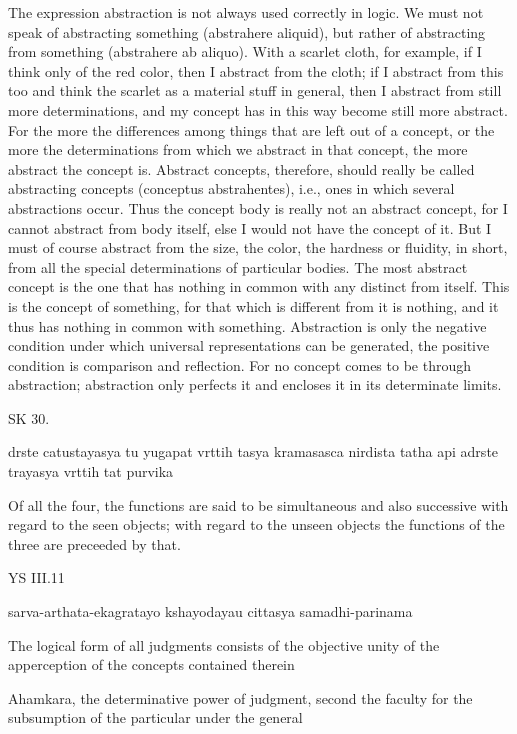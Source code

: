     The expression abstraction is not always used correctly in logic.
    We must not speak of abstracting something (abstrahere aliquid),
    but rather of abstracting from something (abstrahere ab aliquo).
    With a scarlet cloth, for example, if I think only of the red color,
    then I abstract from the cloth;
    if I abstract from this too and think the scarlet as a material stuff in general,
    then I abstract from still more determinations, and my concept has in this
    way become still more abstract.
    For the more the differences among things that are left out of a concept,
    or the more the determinations from which we abstract in that concept,
    the more abstract the concept is.
    Abstract concepts, therefore, should really be called abstracting concepts
    (conceptus abstrahentes), i.e., ones in which several abstractions occur.
    Thus the concept body is really not an abstract concept,
    for I cannot abstract from body itself, else I would not have the concept of it.
    But I must of course abstract from the size, the color, the hardness or fluidity,
    in short, from all the special determinations of particular bodies.
    The most abstract concept is the one that has nothing in common
    with any distinct from itself.
    This is the concept of something, for that which is different from it is nothing,
    and it thus has nothing in common with something.
    Abstraction is only the negative condition under which universal representations
    can be generated, the positive condition is comparison and reflection.
    For no concept comes to be through abstraction;
    abstraction only perfects it and encloses it in its determinate limits.

SK 30.

drste catustayasya tu yugapat vrttih tasya kramasasca nirdista
tatha api adrste trayasya vrttih tat purvika

Of all the four, the functions are said to be simultaneous and also successive
with regard to the seen objects;
with regard to the unseen objects
the functions of the three are preceeded by that.

YS III.11

    sarva-arthata-ekagratayo kshayodayau cittasya samadhi-parinama

    The logical form of all judgments consists of the objective unity of
    the apperception of the concepts contained therein

    Ahamkara, the determinative power of judgment,
    second the faculty for the subsumption of the particular under the general

